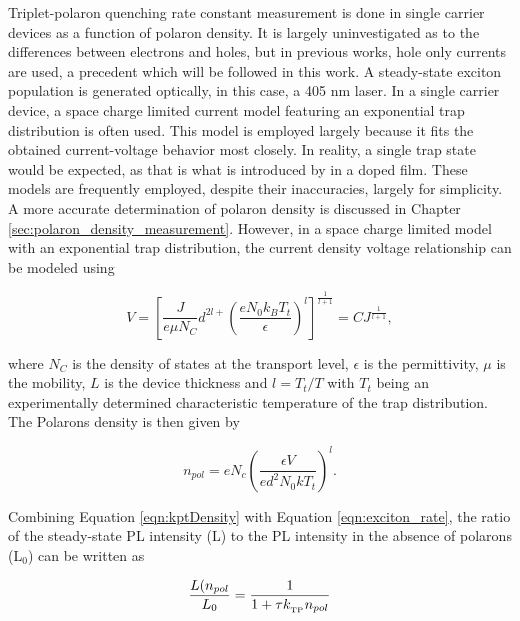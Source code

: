 \documentclass[../thesis.tex]{subfiles}
\begin{document}
Triplet-polaron quenching rate constant measurement is done in single carrier devices as a function of polaron density.  
It is largely uninvestigated as to the differences between electrons and holes, but in previous works, hole only currents are used, a precedent which will be followed in this work.\supercite{Erickson2014,Reineke2007}
A steady-state exciton population is generated optically, in this case, a 405 nm laser.  
In a single carrier device, a space charge limited current model featuring an exponential trap distribution is often used.\supercite{Lampert2002a,Giebink2009a,Pope1999}
This model is employed largely because it fits the obtained current-voltage behavior most closely.  
In reality, a single trap state would be expected, as that is what is introduced by \irppy in a doped film.  
These models are frequently employed, despite their inaccuracies, largely for simplicity.  A more accurate determination of polaron density is discussed in Chapter \ref{sec:polaron_density_measurement}.
However, in a space charge limited model with an exponential trap distribution, the current density voltage relationship can be modeled using

\begin{equation}
V=\left[ \frac{J}{e\mu N_C}d^{2l+}\left( \frac{eN_0k_BT_t}{\epsilon} \right)^l \right]^{\frac{1}{l+1}}=CJ^{\frac{1}{l+1}},
\label{eqn:ktpVoltage}
\end{equation}

where $N_C$ is the density of states at the transport level, $\epsilon$ is the permittivity, $\mu$ is the mobility, $L$ is the device thickness and $l=T_t/T$ with $T_t$ being an experimentally determined characteristic temperature of the trap distribution.  The Polarons density is then given by

\begin{equation}
n_{pol}=eN_c\left(\frac{\epsilon V}{ed^2N_0kT_t}\right)^l.
\label{eqn:kptDensity}
\end{equation}

Combining Equation \ref{eqn:kptDensity} with Equation \ref{eqn:exciton_rate}, the ratio of the steady-state PL intensity (L) to the PL intensity in the absence of polarons (L$_0$) can be written as\supercite{Reineke2007}

\begin{equation}
\frac{L(n_{pol}}{L_0}=\frac{1}{1+\tau k_{_\text{\tiny TP}} n_{pol}}
\label{eqn:ktpFit}
\end{equation}
\end{document}
